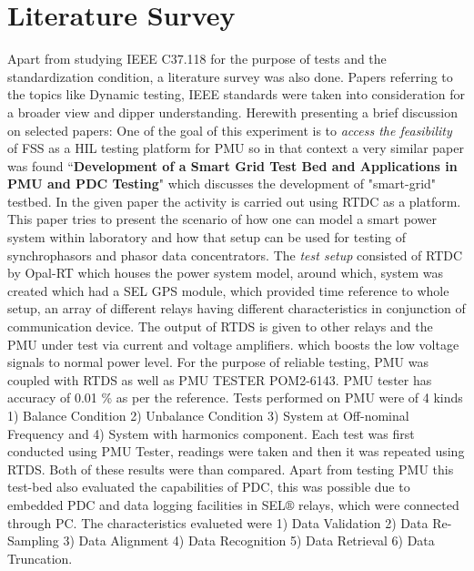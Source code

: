 \section{Literature Survey}

Apart from studying IEEE C37.118 for the purpose of tests and the standardization condition, a literature survey was also done. Papers referring to the topics like Dynamic testing, IEEE standards were taken into consideration for a broader view and dipper understanding. Herewith presenting a brief discussion on selected papers:
One of the goal of this experiment is to \textit{access the feasibility} of FSS as a HIL testing platform for PMU so in that context a very similar paper was found ``\textbf{Development of a Smart Grid Test Bed and Applications in PMU and PDC Testing}"  which discusses the development of "smart-grid" testbed. In the given paper the activity is carried out using RTDC as a platform. This paper tries to present the scenario of how one can model a smart power system within laboratory and how that setup can be used for testing of synchrophasors and phasor data concentrators. The \textit{test setup} consisted of RTDC by Opal-RT which houses the power system model, around which, system was created which had a SEL GPS module, which provided time reference to whole setup, an array of different relays having different characteristics in conjunction of communication device. The output of RTDS is given to other relays and the PMU under test via current and voltage amplifiers. which boosts the low voltage signals to normal power level. For the purpose of reliable testing, PMU was coupled with RTDS as well as PMU TESTER POM2-6143\cite{Paper:saugata}. PMU tester has accuracy of 0.01 \% as per the reference. Tests performed on PMU were of 4 kinds 1) Balance Condition 2) Unbalance Condition 3) System at Off-nominal Frequency and 4) System with harmonics component. Each test was first conducted using PMU Tester, readings were taken and then it was repeated using RTDS. Both of these results were than compared. Apart from testing PMU this test-bed also evaluated the capabilities of PDC, this was possible due to embedded PDC and data logging facilities in SEL$\circledR$ relays, which were connected through PC. The characteristics evalueted were 1) Data Validation 2) Data Re-Sampling 3) Data Alignment 4) Data Recognition 5) Data Retrieval 6) Data Truncation.


